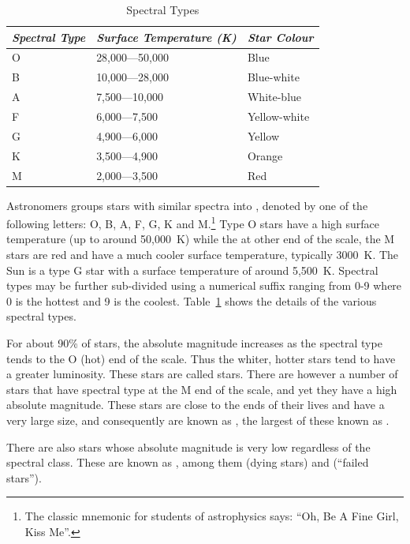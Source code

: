 \begin{table}[tb]
  \centering\small
  \begin{tabular}{lll}
\toprule
\emph{Spectral Type} & \emph{Surface Temperature (K)} & \emph{Star Colour}\\\midrule
O & 28,000---50,000 & Blue\\
B & 10,000---28,000 & Blue-white\\
A & 7,500---10,000 & White-blue\\
F & 6,000---7,500 & Yellow-white\\
G & 4,900---6,000 & Yellow\\
K & 3,500---4,900 & Orange\\
M & 2,000---3,500 & Red\\
\bottomrule    
  \end{tabular}
  \caption{Spectral Types}
  \label{tab:spectraltype}
\end{table}

Astronomers groups stars with similar spectra into , denoted by one of the following letters: O, B, A, F, G, K
and M.\footnote{The classic mnemonic for students of astrophysics
  says: ``Oh, Be A Fine Girl, Kiss Me''.}  Type O stars have a high
surface temperature (up to around 50,000~K) while the at other end of
the scale, the M stars are red and have a much cooler surface
temperature, typically 3000~K. The Sun is a type G star with a surface
temperature of around 5,500~K. Spectral types may be further
sub-divided using a numerical suffix ranging from 0-9 where 0 is the
hottest and 9 is the coolest. Table~\ref{tab:spectraltype} shows the
details of the various spectral types.

For about 90\% of stars, the absolute magnitude increases as the
spectral type tends to the O (hot) end of the scale. Thus the whiter,
hotter stars tend to have a greater luminosity. These stars are called
 stars. There are however a number of stars that
have spectral type at the M end of the scale, and yet they have a high
absolute magnitude. These stars are close to the ends of their lives
and have a very large size, and consequently are known as
, the largest of these known as .

There are also stars whose absolute magnitude is very low regardless
of the spectral class. These are known as , among
them  (dying stars) and 
(``failed stars'').

